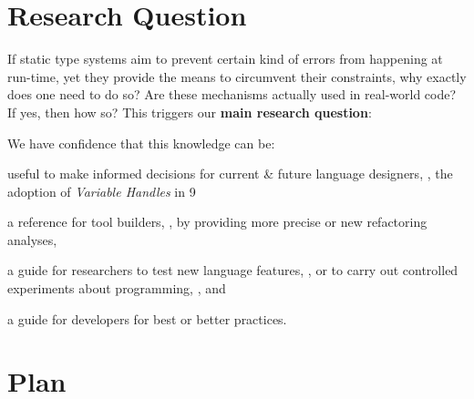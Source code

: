 \section{Research Question}

If static type systems aim to prevent certain kind of errors from happening at run-time,
yet they provide the means to circumvent their constraints,
why exactly does one need to do so?
Are these mechanisms actually used in real-world code?
If yes, then how so?
This triggers our \textbf{main research question}:


We have confidence that this knowledge can be:
\begin{inparaenum}[a)]
\item useful to make informed decisions for current \& future language designers,
\eg{}, the adoption of \emph{Variable Handles} in \java{} 9~\citep{jep193}
\item a reference for tool builders, \eg{}, by providing more precise or new refactoring analyses,
\item a guide for researchers to test new language features, \eg{}, \cite{wintherGuardedTypePromotion2011} or to carry out controlled experiments about programming, \eg{}, \cite{stuchlikStaticVsDynamic2011} and
\item a guide for developers for best or better practices.
\end{inparaenum}

\section{Plan}

